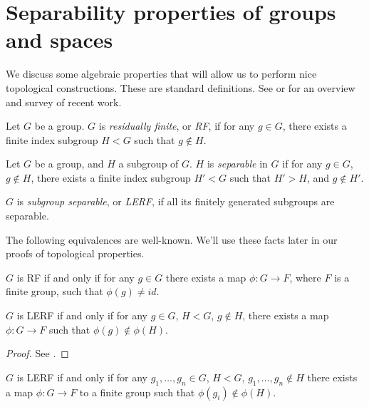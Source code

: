 \section{Separability properties of groups and spaces}

We discuss some algebraic properties that will allow us to perform nice
topological constructions. These are standard definitions. See \cite{LR} or
\cite{AFW} for an overview and survey of recent work.

\begin{defn}

Let $G$ be a group. $G$ is \emph{residually finite}, or \emph{RF}, if for any
$g \in G$, there exists a finite index subgroup $H<G$ such that $g \notin H$.

Let $G$ be a group, and $H$ a subgroup of $G$. $H$ is \emph{separable} in $G$
if for any $g \in G$, $g \notin H$, there exists a finite index subgroup $H'<G$
such that $H'>H$, and $g \notin H'$.

$G$ is \emph{subgroup separable}, or \emph{LERF}, if all its finitely generated
subgroups are separable.

\end{defn}

The following equivalences are well-known.  We'll use these facts later in our
proofs of topological properties.

\begin{prop}\label{P:lerfmap}

$G$ is RF if and only if for any $g \in G$ there exists a map $\phi \colon
G \to F$, where $F$ is a finite group, such that $\phi(g) \neq id$.

$G$ is LERF if and only if for any $g \in G$, $H < G$, $g \notin H$, there
exists a map $\phi \colon G \to F$ such that $\phi(g) \notin \phi(H)$.

\end{prop}

\begin{proof}

See \cite{LR}.

\end{proof}

\begin{cor}\label{C:lerfmap'}

$G$ is LERF if and only if for any $g_1,\dots,g_n \in G$, $H<G$, $g_1,\dots,g_n
\notin H$ there exists a map $\phi \colon G \to F$ to a finite group such that
$\phi(g_i) \notin \phi(H)$.

\end{cor}

